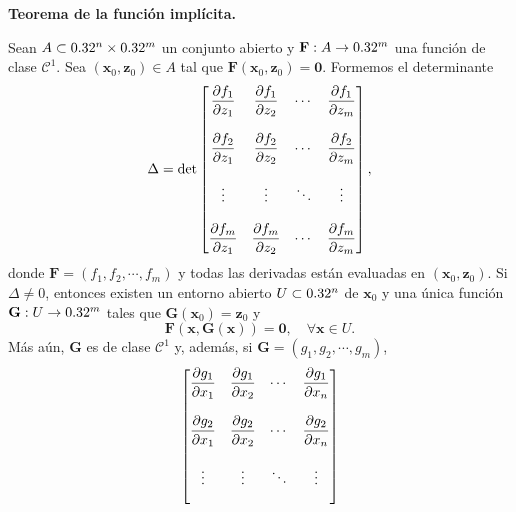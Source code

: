 \begin{theorem}\textbf{Teorema de la funci\'on impl\'icita.} \label{teo:implicit}
\mbox{}

 Sean $A \subset 0.32^n \times 0.32^m$ un conjunto abierto y $\mathbf{F}: A \to 0.32^m$ una funci\'on de clase $\mathcal{C}^1$. Sea $(\mathbf{x}_0,\mathbf{z}_0) \in A$ tal que $\mathbf{F}(\mathbf{x}_0,\mathbf{z}_0) = \mathbf{0}$. Formemos el determinante
 \[
  \Delta = \det \begin{bmatrix} 
                \dfrac{\partial f_1}{\partial z_1} & \dfrac{\partial f_1}{\partial z_2} & \cdots & \dfrac{\partial f_1}{\partial z_m} \\
                               &                &        &                \\
                \dfrac{\partial f_2}{\partial z_1} & \dfrac{\partial f_2}{\partial z_2} & \cdots & \dfrac{\partial f_2}{\partial z_m} \\
                               &                &        &                \\
                \vdots         &  \vdots        & \ddots & \vdots         \\
                               &                &        &                \\
                \dfrac{\partial f_m}{\partial z_1} & \dfrac{\partial f_m}{\partial z_2} & \cdots & \dfrac{\partial f_m}{\partial z_m}
                \end{bmatrix},
 \]
 donde $\mathbf{F} = (f_1, f_2, \cdots , f_m)$ y todas las derivadas est\'an evaluadas en $(\mathbf{x}_0,\mathbf{z}_0)$. Si $\Delta \ne 0$, entonces existen un entorno abierto $U \subset 0.32^n$ de $\mathbf{x}_0$
 y una \'unica funci\'on $\mathbf{G}: U \to 0.32^m$ tales que $\mathbf{G}(\mathbf{x}_0) = \mathbf{z}_0$ y
 \[
  \mathbf{F}(\mathbf{x},\mathbf{G}(\mathbf{x})) = \mathbf{0},\quad \forall \mathbf{x} \in U.
 \]
 M\'as a\'un, $\mathbf{G}$ es de clase $\mathcal{C}^1$ y, adem\'as, si $\mathbf{G} = (g_1, g_2, \cdots , g_m)$,
 \[
  \begin{bmatrix} 
                \dfrac{\partial g_1}{\partial x_1} & \dfrac{\partial g_1}{\partial x_2} & \cdots & \dfrac{\partial g_1}{\partial x_n} \\
                               &                &        &                \\
                \dfrac{\partial g_2}{\partial x_1} & \dfrac{\partial g_2}{\partial x_2} & \cdots & \dfrac{\partial g_2}{\partial x_n} \\
                               &                &        &                \\
                 \vdots         &  \vdots        & \ddots & \vdots         \\
                               &                &        &                \\

\end{bmatrix}\]
\end{theorem}
